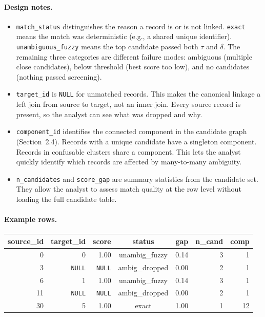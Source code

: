 \documentclass[12pt]{article}
\begin{document}
\paragraph{Design notes.}
\begin{itemize}
    \item \texttt{match\_status} distinguishes the reason a record is or is not linked. \texttt{exact} means the match was deterministic (e.g., a shared unique identifier). \texttt{unambiguous\_fuzzy} means the top candidate passed both $\tau$ and $\delta$. The remaining three categories are different failure modes: ambiguous (multiple close candidates), below threshold (best score too low), and no candidates (nothing passed screening).
    \item \texttt{target\_id} is \texttt{NULL} for unmatched records. This makes the canonical linkage a left join from source to target, not an inner join.  Every source record is present, so the analyst can see what was dropped and why.
    \item \texttt{component\_id} identifies the connected component in the candidate graph (Section~2.4). Records with a unique candidate have a singleton component. Records in confusable clusters share a component. This lets the analyst quickly identify which records are affected by many-to-many ambiguity.
    \item \texttt{n\_candidates} and \texttt{score\_gap} are summary statistics from the candidate set. They allow the analyst to assess match quality at the row level without loading the full candidate table.
\end{itemize}

\paragraph{Example rows.}

\begin{center}
\small
\begin{tabular}{rrrccrr}
\toprule
source\_id & target\_id & score & status & gap & n\_cand & comp \\
\midrule
0 & 0 & 1.00 & unambig\_fuzzy & 0.14 & 3 & 1 \\
3 & \texttt{NULL} & \texttt{NULL} & ambig\_dropped & 0.00 & 2 & 1 \\
6 & 1 & 1.00 & unambig\_fuzzy & 0.14 & 3 & 1 \\
11 & \texttt{NULL} & \texttt{NULL} & ambig\_dropped & 0.00 & 2 & 1 \\
30 & 5 & 1.00 & exact & 1.00 & 1 & 12 \\
\bottomrule
\end{tabular}
\end{center}
\end{document}
